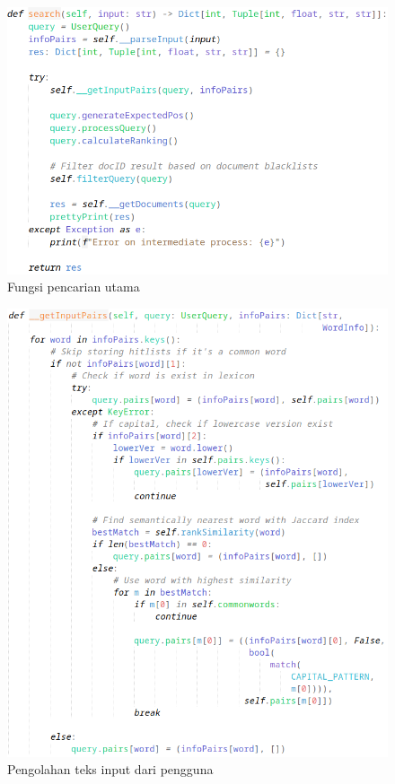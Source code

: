 \begin{figure}[H]
  \centering{}
	\includegraphics[width=\textwidth]{gambar/implementasi_search}
  \caption{Fungsi pencarian utama}
\end{figure}

\begin{figure}[H]
  \centering{}
	\includegraphics[width=\textwidth]{gambar/implementasi_getinputpairs}
  \caption{Pengolahan teks input dari pengguna}
\end{figure}

